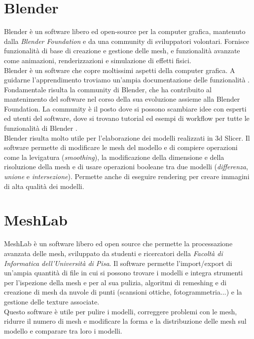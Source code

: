 \section{Blender} 
Blender \parencite{Reference32} è un software libero ed open-source per la computer grafica, mantenuto dalla \emph{Blender Foundation} e da una community di sviluppatori volontari. Fornisce funzionalità di base di creazione e gestione delle mesh, e funzionalità avanzate come animazioni, renderizzazioni e simulazione di effetti fisici.\\
Blender è un software che copre moltissimi aspetti della computer grafica. A guidarne l'apprendimento troviamo un'ampia documentazione delle funzionalità \parencite{Reference33}. Fondamentale risulta la community di Blender, che ha contribuito al mantenimento del software nel corso della sua evoluzione assieme alla Blender Foundation. La community è il posto dove si possono scambiare idee con esperti ed utenti del software, dove si trovano tutorial ed esempi di workflow per tutte le funzionalità di Blender \parencite{Reference34}.\\
Blender risulta molto utile per l'elaborazione dei modelli realizzati in 3d Slicer. Il software permette di modificare le mesh del modello e di compiere operazioni come la levigatura (\emph{smoothing}), la modificazione della dimensione e della risoluzione della mesh e di usare operazioni booleane tra due modelli (\emph{differenza}, \emph{unione} e \emph{intersezione}). Permette anche di eseguire rendering per creare immagini di alta qualità dei modelli.

\section{MeshLab} 
MeshLab \parencite{Reference36} è un software libero ed open source che permette la processazione avanzata delle mesh, sviluppato da studenti e ricercatori della \emph{Facoltà di Informatica dell'Università di Pisa}. Il software permette l'import/export di un'ampia quantità di file in cui si possono trovare i modelli e integra strumenti per l'ispezione della mesh e per al sua pulizia, algoritmi di remeshing e di creazione di mesh da nuvole di punti (scansioni ottiche, fotogrammetria...) e la gestione delle texture associate.\\
Questo software è utile per pulire i modelli, correggere problemi con le mesh, ridurre il numero di mesh e modificare la forma e la distribuzione delle mesh sul modello e comparare tra loro i modelli.

